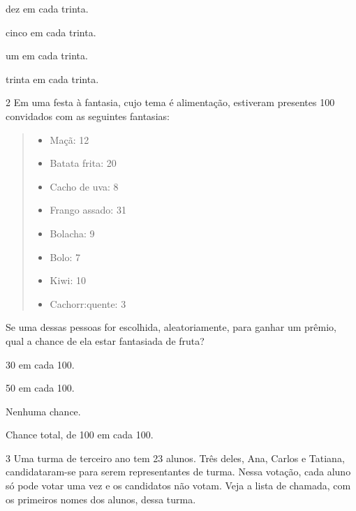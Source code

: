 \begin{escolha}
\item
  dez em cada trinta.
\item
  cinco em cada trinta.
\item
  um em cada trinta.
\item
  trinta em cada trinta.
\end{escolha}


\num{2} Em uma festa à fantasia, cujo tema é alimentação, estiveram presentes  100 convidados com as seguintes fantasias:

\begin{quote}
\begin{itemize}
\item Maçã: 12
\item Batata frita: 20
\item Cacho de uva: 8
\item Frango assado: 31
\item Bolacha: 9
\item Bolo: 7
\item Kiwi: 10
\item Cachorr:quente: 3
\end{itemize}
\end{quote}

Se uma dessas pessoas for escolhida, aleatoriamente, para ganhar um prêmio, qual a chance de ela estar fantasiada de fruta?

\begin{escolha}
\item
30 em cada 100.
\item
50 em cada 100.
\item
Nenhuma chance.
\item
Chance total, de 100 em cada 100.
\end{escolha}


\num{3} Uma turma de terceiro ano tem 23 alunos. Três deles, Ana, Carlos e Tatiana, candidataram-se para serem representantes de turma. Nessa votação, cada aluno só pode votar uma vez e os candidatos não votam. Veja a lista de chamada, com os primeiros nomes dos alunos, dessa turma.


